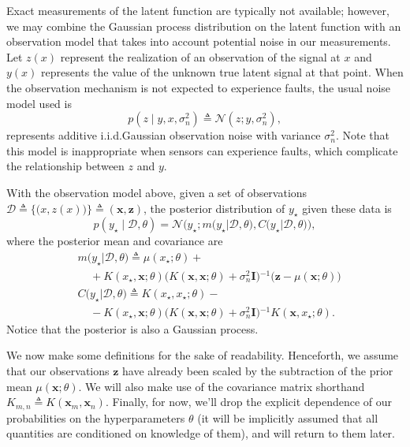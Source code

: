 \documentclass{article}
\newcommand{\deq}{\ensuremath{\triangleq}}
\newcommand{\given}{\ensuremath{\mid}}
\newcommand{\cm}[1]{\ensuremath{\mathcal{#1}}}
\newcommand{\bm}[1]{\ensuremath{\mathbf{#1}}}
\newcommand{\data}{\ensuremath{\cm{D}}}
\newcommand{\inv}{\ensuremath{^{-1}}}
\newcommand{\vect}[1]{\bm{#1}}
\newcommand{\vz}{\vect{z}}
\newcommand{\vx}{\vect{x}}
\newcommand{\mean}[2]{{m}\bigl(#1\big\vert#2\bigr)}
\newcommand{\cov}[2]{{C}\bigl(#1\big\vert#2\bigr)}
\newcommand{\st}{_{\star}}
\newcommand{\defequal}{\triangleq}
\begin{document}
Exact measurements of the latent function are typically not available;
however, we may combine the Gaussian process distribution on the
latent function with an observation model that takes into account
potential noise in our measurements. 
Let $z(x)$ represent the realization of an observation of the
signal at $x$ and $y(x)$ represents the value of the unknown true
latent signal at that point.
 When the observation mechanism
is not expected to experience faults, the usual noise model used is
\begin{equation}\label{iidnoise}
 p(z \given y, x, \sigma_n^2)
 \deq
 \cm{N}(z; y, \sigma_n^2),
\end{equation}
represents additive i.i.d.\space Gaussian observation noise with
variance $\sigma_n^2$. Note that this model is inappropriate when sensors
can experience faults, which complicate the relationship between $z$ and $y$.

With the observation model above, given a set of observations
$
 \data
 \deq
 \bigl\lbrace
   \bigl( x, z(x) \bigr)
  \bigr\rbrace
 \deq
 ( \bm{x}, \bm{z} )$,
the posterior distribution of $y\st$ given these data is
\begin{equation*}
 p(y\st \given \data, \theta)
 =
 \cm{N}
 \bigl(
   y\st;
   \mean{y\st}{\data,\theta},
   \cov{y\st}{\data,\theta}
 \bigr),
\end{equation*}
where the posterior mean and covariance are
\begin{align*}
 &
 \mean{y\st}{\data,\theta}
 \deq
 \mu(x\st; \theta)
 +
 {}
 \\
 &
 \mspace{20mu}
 +
 K(x\st, \bm{x}; \theta)
 \bigl(
 K(\bm{x}, \bm{x}; \theta) + \sigma_n^2 \bm{I}
 \bigr)\inv
 \bigl(
   \bm{z} - \mu(\bm{x}; \theta)
 \bigr)
 \\  
 &
 \cov{y\st}{\data,\theta}
 \deq
 K(x\st, x\st; \theta)
 -
 {}
 \\
 &
 \mspace{20mu}
 -
 K(x\st, \bm{x}; \theta)
 \bigl(
   K(\bm{x}, \bm{x}; \theta) + \sigma_n^2 \bm{I}
 \bigr)\inv
 K(\bm{x}, x\st; \theta).
\end{align*}
Notice that the posterior is also a Gaussian process. 

We now make some definitions for the sake of readability. Henceforth, we assume that our observations $\vz$ have already been scaled by the subtraction of the prior mean $\mu(\bm{x}; \theta)$. We will also make use of the covariance matrix shorthand $K_{m,n} \defequal K(\vx_m,\vx_n)$. Finally, for now, we'll drop the explicit dependence of our probabilities on the hyperparameters $\theta$ (it will be implicitly assumed that all quantities are conditioned on knowledge of them), and will return to them later.
\end{document}
